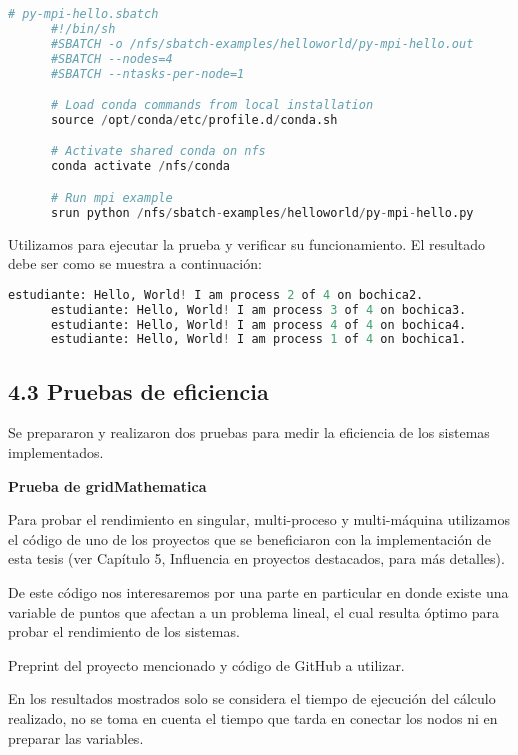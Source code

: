 \begin{spacing}{1.5}
    \begin{lstlisting}[language=python]
      # py-mpi-hello.sbatch
      #!/bin/sh
      #SBATCH -o /nfs/sbatch-examples/helloworld/py-mpi-hello.out
      #SBATCH --nodes=4
      #SBATCH --ntasks-per-node=1

      # Load conda commands from local installation
      source /opt/conda/etc/profile.d/conda.sh

      # Activate shared conda on nfs
      conda activate /nfs/conda

      # Run mpi example
      srun python /nfs/sbatch-examples/helloworld/py-mpi-hello.py
    \end{lstlisting}

    Utilizamos  para ejecutar la prueba y verificar su funcionamiento. El resultado debe ser como se muestra a continuación:

      \begin{lstlisting}[language=python]
      estudiante: Hello, World! I am process 2 of 4 on bochica2.
      estudiante: Hello, World! I am process 3 of 4 on bochica3.
      estudiante: Hello, World! I am process 4 of 4 on bochica4.
      estudiante: Hello, World! I am process 1 of 4 on bochica1. 
      \end{lstlisting}
      
  \subsection{4.3 Pruebas de eficiencia}  \label{chap:4.3}

  Se prepararon y realizaron dos pruebas para medir la eficiencia de los sistemas implementados.

      \textbf{Prueba de gridMathematica}

      Para probar el rendimiento en singular, multi-proceso y multi-máquina utilizamos el código de uno de los proyectos que se beneficiaron con la implementación de esta tesis (ver Capítulo 5, Influencia en proyectos destacados, para más detalles).

      De este código nos interesaremos por una parte en particular en donde existe una variable de puntos que afectan a un problema lineal, el cual resulta óptimo para probar el rendimiento de los sistemas.

      Preprint del proyecto mencionado y código de GitHub a utilizar. \cite{preprint} \cite{git}

      En los resultados mostrados solo se considera el tiempo de ejecución del cálculo realizado, no se toma en cuenta el tiempo que tarda en conectar los nodos ni en preparar las variables.


\end{spacing}
